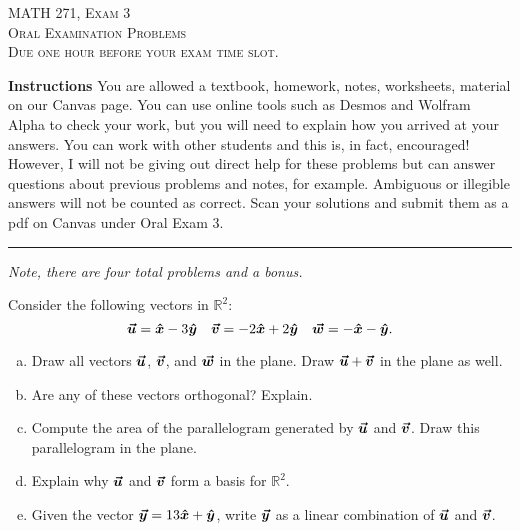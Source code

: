 \documentclass[12pt]{amsbook}
\newcommand{\R}{\mathbb{R}}
\begin{document}

\begin{center}
   \textsc{\large MATH 271, Exam 3}\\
   \textsc{Oral Examination Problems}\\
   \textsc{Due one hour before your exam time slot.}
\end{center}

\vspace{1cm}

\noindent\textbf{Instructions} \; You are allowed a textbook, homework, notes, worksheets, material on our Canvas page.  You can use online tools such as Desmos and Wolfram Alpha to check your work, but you will need to explain how you arrived at your answers.  You can work with other students and this is, in fact, encouraged! However, I will not be giving out direct help for these problems but can answer questions about previous problems and notes, for example. Ambiguous or illegible answers will not be counted as correct. Scan your solutions and submit them as a pdf on Canvas under Oral Exam 3.


\vspace{1cm}


\hrule

\vspace*{1cm}
\noindent\emph{Note, there are four total problems and a bonus.}

\newpage
\begin{problem}
Consider the following vectors in $\R^2$:
\[
\boldsymbol{\boldsymbol{\vec{u}}} = \boldsymbol{\hat{x}} -3\boldsymbol{\hat{y}} \quad \boldsymbol{\boldsymbol{\vec{v}}} = -2\boldsymbol{\hat{x}} + 2\boldsymbol{\hat{y}} \quad \boldsymbol{\boldsymbol{\vec{w}}} = -\boldsymbol{\hat{x}} -\boldsymbol{\hat{y}}.
\]
\begin{enumerate}[(a)]
    \item Draw all vectors $\boldsymbol{\boldsymbol{\vec{u}}}$, $\boldsymbol{\boldsymbol{\vec{v}}}$, and $\boldsymbol{\boldsymbol{\vec{w}}}$ in the plane. Draw $\boldsymbol{\boldsymbol{\vec{u}}} + \boldsymbol{\boldsymbol{\vec{v}}}$ in the plane as well.
    \item Are any of these vectors orthogonal? Explain.
    \item Compute the area of the parallelogram generated by $\boldsymbol{\boldsymbol{\vec{u}}}$ and $\boldsymbol{\boldsymbol{\vec{v}}}$. Draw this parallelogram in the plane.
    \item Explain why $\boldsymbol{\boldsymbol{\vec{u}}}$ and $\boldsymbol{\boldsymbol{\vec{v}}}$ form a basis for $\R^2$.
    \item Given the vector $\boldsymbol{\boldsymbol{\vec{y}}} = 13\boldsymbol{\hat{x}} + \boldsymbol{\hat{y}}$, write $\boldsymbol{\boldsymbol{\vec{y}}}$ as a linear combination of $\boldsymbol{\boldsymbol{\vec{u}}}$ and $\boldsymbol{\boldsymbol{\vec{v}}}$.
\end{enumerate}
\end{problem}
\end{document}
